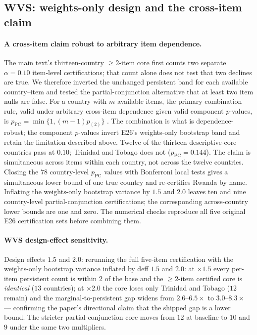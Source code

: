 \documentclass[12pt]{article}
\theoremstyle{definition}
\theoremstyle{remark}
\begin{document}
\subsection{WVS: weights-only design and the cross-item claim}

\paragraph{A cross-item claim robust to arbitrary item dependence.}
The main text's thirteen-country $\ge2$-item core first counts two separate
$\alpha=0.10$ item-level certifications; that count alone does not test that
two declines are true. We therefore inverted the unchanged persistent band for
each available country--item and tested the partial-conjunction alternative
that at least two item nulls are false. For a country with $m$ available items,
the primary combination rule, valid under arbitrary cross-item dependence
given valid component $p$-values, is
$p_{\mathrm{PC}}=\min\{1,(m-1)p_{(2)}\}$
\citep{benjamini2008screening}. The combination is what is
dependence-robust; the component $p$-values invert E26's weights-only
bootstrap band and retain the limitation described above. Twelve of the thirteen descriptive-core
countries pass at $0.10$; Trinidad and Tobago does not
($p_{\mathrm{PC}}=0.144$). The claim is simultaneous across items within each
country, not across the twelve countries. Closing the $78$ country-level
$p_{\mathrm{PC}}$ values with Bonferroni local tests gives a simultaneous lower
bound of one true country and re-certifies Rwanda by name. Inflating the
weights-only bootstrap variance by $1.5$ and $2.0$ leaves ten and nine
country-level partial-conjunction certifications; the corresponding
across-country lower bounds are one and zero. The numerical checks reproduce all
five original E26 certification sets before combining them.

\paragraph{WVS design-effect sensitivity.} Design effects $1.5$ and $2.0$: rerunning the full five-item certification
with the weights-only bootstrap variance inflated by deff $1.5$ and $2.0$: at
$\times1.5$ every per-item persistent count is within $2$ of the base and the
$\ge2$-item certified core is \emph{identical} ($13$ countries); at $\times2.0$
the core loses only Trinidad and Tobago ($12$ remain) and the
marginal-to-persistent gap widens from $2.6$--$6.5\times$ to $3.0$--$8.3\times$
--- confirming the paper's directional claim that the shipped gap is a lower
bound. The stricter partial-conjunction core moves from $12$ at
baseline to $10$ and $9$ under the same two multipliers.
\end{document}

